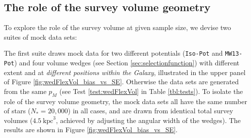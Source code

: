 \documentclass[iop,revtex4]{emulateapj}
\newcommand{\pmodel}{\ensuremath{p_M}}
\begin{document}
\subsection{The role of the survey volume geometry} \label{sec:results_obsvolume}

To explore the role of the survey volume at given sample size, we devise two suites of mock data sets: 

The first suite draws mock data for two different potentials (\texttt{Iso-Pot} and \texttt{MW13-Pot}) and four volume wedges (see Section \ref{sec:selectionfunction}) with different extent and at {\it different positions within the Galaxy}, illustrated in the upper panel of Figure \ref{fig:wedFlexVol_bias_vs_SE}. Otherwise the data sets are generated from the same \pmodel{} (see Test \ref{test:wedFlexVol} in Table \ref{tbl:tests}). To isolate the role of the survey volume geometry, the mock data sets all have the same number of stars ($N_{*} = 20,000$) in all cases, and are drawn from identical total survey volumes ($4.5~\text{kpc}^3$, achieved by adjusting the angular width of the wedges). The results are shown in Figure \ref{fig:wedFlexVol_bias_vs_SE}.
\end{document}
